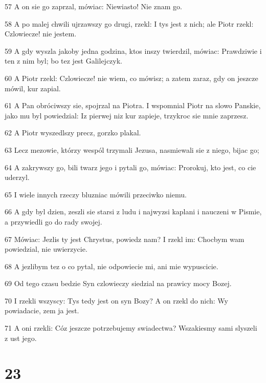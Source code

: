 \par 57 A on sie go zaprzal, mówiac: Niewiasto! Nie znam go.
\par 58 A po malej chwili ujrzawszy go drugi, rzekl: I tys jest z nich; ale Piotr rzekl: Czlowiecze! nie jestem.
\par 59 A gdy wyszla jakoby jedna godzina, ktos inszy twierdzil, mówiac: Prawdziwie i ten z nim byl; bo tez jest Galilejczyk.
\par 60 A Piotr rzekl: Czlowiecze! nie wiem, co mówisz; a zatem zaraz, gdy on jeszcze mówil, kur zapial.
\par 61 A Pan obróciwszy sie, spojrzal na Piotra. I wspomnial Piotr na slowo Panskie, jako mu byl powiedzial: Iz pierwej niz kur zapieje, trzykroc sie mnie zaprzesz.
\par 62 A Piotr wyszedlszy precz, gorzko plakal.
\par 63 Lecz mezowie, którzy wespól trzymali Jezusa, nasmiewali sie z niego, bijac go;
\par 64 A zakrywszy go, bili twarz jego i pytali go, mówiac: Prorokuj, kto jest, co cie uderzyl.
\par 65 I wiele innych rzeczy bluzniac mówili przeciwko niemu.
\par 66 A gdy byl dzien, zeszli sie starsi z ludu i najwyzsi kaplani i nauczeni w Pismie, a przywiedli go do rady swojej.
\par 67 Mówiac: Jezlis ty jest Chrystus, powiedz nam? I rzekl im: Chocbym wam powiedzial, nie uwierzycie.
\par 68 A jezlibym tez o co pytal, nie odpowiecie mi, ani mie wypuscicie.
\par 69 Od tego czasu bedzie Syn czlowieczy siedzial na prawicy mocy Bozej.
\par 70 I rzekli wszyscy: Tys tedy jest on syn Bozy? A on rzekl do nich: Wy powiadacie, zem ja jest.
\par 71 A oni rzekli: Cóz jeszcze potrzebujemy swiadectwa? Wszakiesmy sami slyszeli z ust jego.

\chapter{23}


